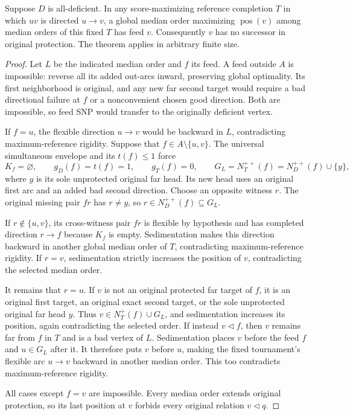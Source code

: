 \begin{theorem}
\label{thm:two-heavy-flexible-head-feed}
Suppose $D$ is all-deficient. In any score-maximizing reference
completion $T$ in which $uv$ is directed $u\to v$, a global median
order maximizing $\operatorname{pos}(v)$ among median orders of
this fixed $T$ has feed $v$. Consequently $v$ has no successor in
original protection. The theorem applies in arbitrary finite size.
\end{theorem}
\begin{proof}
Let $L$ be the indicated median order and $f$ its feed. A feed outside
$A$ is impossible: reverse all its added out-arcs inward, preserving
global optimality. Its first neighborhood is original, and any new
far second target would require a bad directional failure at $f$ or
a nonconvenient chosen good direction. Both are impossible, so feed
SNP would transfer to the originally deficient vertex.

If $f=u$, the flexible direction $u\to v$ would be backward in $L$,
contradicting maximum-reference rigidity. Suppose that
$f\in A\setminus\{u,v\}$. The universal simultaneous envelope
and its $t(f)\le1$ force
\[
 K_f=\varnothing,\qquad g_D(f)=t(f)=1,\qquad g_T(f)=0,
 \qquad G_L=N_T^{++}(f)=N_D^{++}(f)\cup\{y\},
\]
where $y$ is its sole unprotected original far head. Its new head
uses an original first arc and an added bad second direction.
Choose an opposite witness $r$. The original missing pair $fr$ has
$r\ne y$, so $r\in N_D^{++}(f)\subseteq G_L$.

If $r\notin\{u,v\}$, its cross-witness pair $fr$ is flexible by
hypothesis and has completed direction $r\to f$ because $K_f$ is
empty. Sedimentation makes this direction backward in another global
median order of $T$, contradicting maximum-reference rigidity.
If $r=v$, sedimentation strictly increases the position of $v$,
contradicting the selected median order.

It remains that $r=u$. If $v$ is not an original protected far target
of $f$, it is an original first target, an original exact second
target, or the sole unprotected original far head $y$. Thus
$v\in N_T^+(f)\cup G_L$, and sedimentation increases its position,
again contradicting the selected order. If instead
$v\triangleleft f$, then $v$ remains far from $f$ in $T$ and is a
bad vertex of $L$. Sedimentation places $v$ before the feed $f$ and
$u\in G_L$ after it. It therefore puts $v$ before $u$, making the
fixed tournament's flexible arc $u\to v$ backward in another median
order. This too contradicts maximum-reference rigidity.

All cases except $f=v$ are impossible. Every median order extends
original protection, so its last position at $v$ forbids every
original relation $v\triangleleft q$.
\end{proof}

